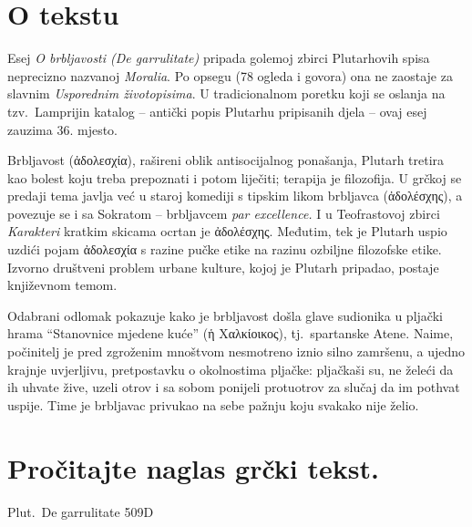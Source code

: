 

\section*{O tekstu}

Esej \textit{O brbljavosti (De garrulitate)} pripada golemoj zbirci Plutarhovih spisa neprecizno nazvanoj \textit{Moralia}. Po opsegu (78 ogleda i govora) ona ne zaostaje za slavnim \textit{Usporednim životopisima}. U tradicionalnom poretku koji se oslanja na tzv.\ Lamprijin katalog – antički popis Plutarhu pripisanih djela – ovaj esej zauzima 36. mjesto. 

Brbljavost \textgreek[variant=ancient]{(ἀδολεσχία),} rašireni oblik antisocijalnog ponašanja, Plutarh tretira kao bolest koju treba prepoznati i potom liječiti; terapija je filozofija. U grčkoj se predaji tema javlja već u staroj komediji s tipskim likom brbljavca \textgreek[variant=ancient]{(ἀδολέσχης)}, a povezuje se i sa Sokratom – brbljavcem \textit{par excellence.} I u Teofrastovoj zbirci \textit{Karakteri} kratkim skicama ocrtan je \textgreek[variant=ancient]{ἀδολέσχης.} Međutim, tek je Plutarh uspio uzdići pojam \textgreek[variant=ancient]{ἀδολεσχία} s razine pučke etike na razinu ozbiljne filozofske etike. Izvorno društveni problem urbane kulture, kojoj je Plutarh pripadao, postaje književnom temom.

Odabrani odlomak pokazuje kako je brbljavost došla glave sudionika u pljački hrama ``Stanovnice mjedene kuće'' \textgreek[variant=ancient]{(ἡ Χαλκίοικος),} tj.\ spartanske Atene. Naime, počinitelj je pred zgroženim mnoštvom nesmotreno iznio silno zamršenu, a ujedno krajnje uvjerljivu, pretpostavku o okolnostima pljačke: pljačkaši su, ne želeći da ih uhvate žive, uzeli otrov i sa sobom ponijeli protuotrov za slučaj da im pothvat uspije. Time je brbljavac privukao na sebe pažnju koju svakako nije želio.


\section*{Pročitajte naglas grčki tekst.}

Plut.\ De garrulitate 509D


\medskip


